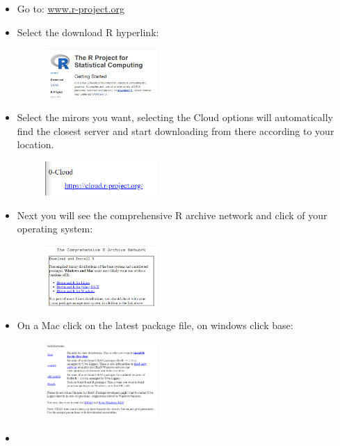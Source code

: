 \begin{itemize}
    \item Go to: \url{www.r-project.org}
    \item Select the download R hyperlink:
        \begin{figure}[H]
            \centering
            \includegraphics[width=0.4\textwidth]{./Figs/2020-12-25-23-42-12.png}
        \end{figure}
    
    \item Select the mirors you want, selecting the Cloud options will automatically find the closest server and start downloading from there according to your location.
        \begin{figure}[H]
            \centering
            \includegraphics[width=0.4\textwidth]{./Figs/2020-12-25-23-43-12.png}
        \end{figure}
    
        
    \item Next you will see the comprehensive R archive network and click of your operating system:
        \begin{figure}[H]
            \centering
            \includegraphics[width=0.4\textwidth]{./Figs/2020-12-25-23-44-20.png}
        \end{figure}
    
    \item On a Mac click on the latest package file, on windows click base:
        \begin{figure}[H]
            \centering
            \includegraphics[width=0.4\textwidth]{./Figs/2020-12-25-23-45-06.png}
        \end{figure}
    
    \item 
\end{itemize}
